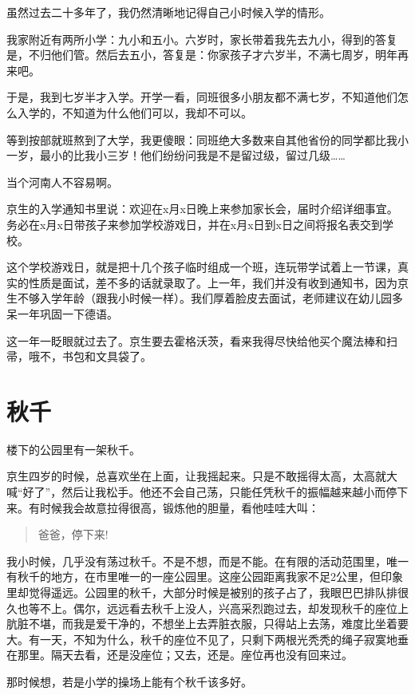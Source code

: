 \documentclass[twoside,openright,headings=optiontohead]{ctexbook} %
\begin{document}
{虽然过去二十多年了，我仍然清晰地记得自己小时候入学的情形。

我家附近有两所小学：九小和五小。六岁时，家长带着我先去九小，得到的答复是，不归他们管。然后去五小，答复是：你家孩子才六岁半，不满七周岁，明年再来吧。

于是，我到七岁半才入学。开学一看，同班很多小朋友都不满七岁，不知道他们怎么入学的，不知道为什么他们可以，我却不可以。

等到按部就班熬到了大学，我更傻眼：同班绝大多数来自其他省份的同学都比我小一岁，最小的比我小三岁！他们纷纷问我是不是留过级，留过几级\ldots{}\ldots{}

当个河南人不容易啊。

京生的入学通知书里说：欢迎在x月x日晚上来参加家长会，届时介绍详细事宜。务必在x月x日带孩子来参加学校游戏日，并在x月x日到x日之间将报名表交到学校。

这个学校游戏日，就是把十几个孩子临时组成一个班，连玩带学试着上一节课，真实的性质是面试，差不多的话就录取了。上一年，我们并没有收到通知书，因为京生不够入学年龄（跟我小时候一样）。我们厚着脸皮去面试，老师建议在幼儿园多呆一年巩固一下德语。

这一年一眨眼就过去了。京生要去霍格沃茨，看来我得尽快给他买个魔法棒和扫帚，哦不，书包和文具袋了。

\chapter*{秋千}

楼下的公园里有一架秋千。

京生四岁的时候，总喜欢坐在上面，让我摇起来。只是不敢摇得太高，太高就大喊``好了''，然后让我松手。他还不会自己荡，只能任凭秋千的振幅越来越小而停下来。有时候我会故意拉得很高，锻炼他的胆量，看他哇哇大叫：

\begin{quote}
爸爸，停下来!
\end{quote}

我小时候，几乎没有荡过秋千。不是不想，而是不能。在有限的活动范围里，唯一有秋千的地方，在市里唯一的一座公园里。这座公园距离我家不足2公里，但印象里却觉得遥远。公园里的秋千，大部分时候是被别的孩子占了，我眼巴巴排队排很久也等不上。偶尔，远远看去秋千上没人，兴高采烈跑过去，却发现秋千的座位上肮脏不堪，而我是爱干净的，不想坐上去弄脏衣服，只得站上去荡，难度比坐着要大。有一天，不知为什么，秋千的座位不见了，只剩下两根光秃秃的绳子寂寞地垂在那里。隔天去看，还是没座位；又去，还是。座位再也没有回来过。

那时候想，若是小学的操场上能有个秋千该多好。

}
\end{document}
